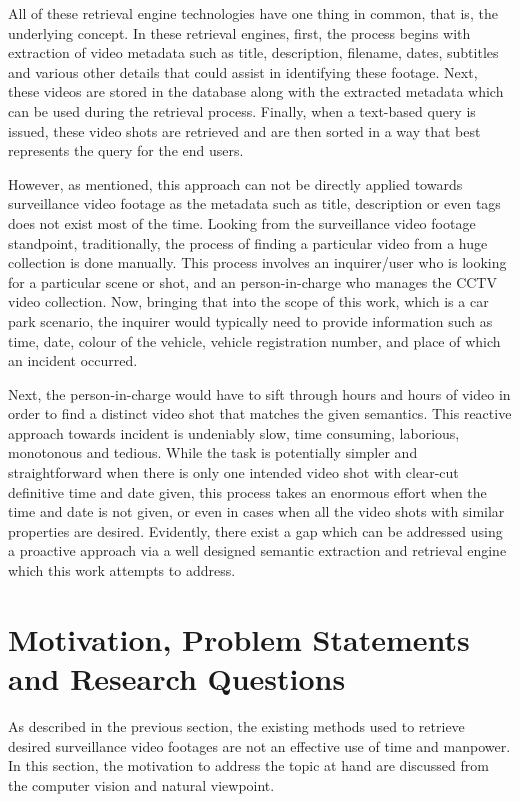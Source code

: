 All of these retrieval engine technologies have one thing in common, that is, the underlying concept. In these retrieval engines, first, the process begins with extraction of video metadata such as title, description, filename, dates, subtitles and various other details that could assist in identifying these footage. Next, these videos are stored in the database along with the extracted metadata which can be used during the retrieval process. Finally, when a text-based query is issued, these video shots are retrieved and are then sorted in a way that best represents the query for the end users. 

However, as mentioned, this approach can not be directly applied towards surveillance video footage as the metadata such as title, description or even tags does not exist most of the time. Looking from the surveillance video footage standpoint, traditionally, the process of finding a particular video from a huge collection is done manually. This process involves an inquirer/user who is looking for a particular scene or shot, and an person-in-charge who manages the CCTV video collection. Now, bringing that into the scope of this work, which is a car park scenario, the inquirer would typically need to provide information such as time, date, colour of the vehicle, vehicle registration number, and place of which an incident occurred. %

Next, the person-in-charge would have to sift through hours and hours of video in order to find a distinct video shot that matches the given semantics. This reactive approach towards incident is undeniably slow, time consuming, laborious, monotonous and tedious. While the task is potentially simpler and straightforward when there is only one intended video shot with clear-cut definitive time and date given, this process takes an enormous effort when the time and date is not given, or even in cases when all the video shots with similar properties are desired. Evidently, there exist a gap which can be addressed using a proactive approach via a well designed semantic extraction and retrieval engine which this work attempts to address.

\section{Motivation, Problem Statements and Research Questions}

As described in the previous section, the existing methods used to retrieve desired surveillance video footages are not an effective use of time and manpower. In this section, the motivation to address the topic at hand are discussed from the computer vision and natural viewpoint.

